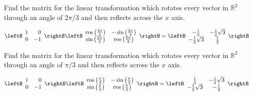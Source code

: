 \begin{enumialphparenastyle}
\begin{ex} Find the matrix for the linear transformation which rotates every
vector in $\mathbb{R}^{2}$ through an angle of $2\pi /3$ and then reflects
across the $x$ axis.
\begin{sol}
\[
\leftB
\begin{array}{rr}
1 & 0 \\
0 & -1
\end{array}
\rightB \leftB
\begin{array}{cc}
\cos \left( \frac{2\pi }{3}\right)  & -\sin \left( \frac{2\pi }{3}\right)
\\
\sin \left( \frac{2\pi }{3}\right)  & \cos \left( \frac{2\pi }{3}\right)
\end{array}
\rightB = \leftB
\begin{array}{cc}
-\frac{1}{2} & -\frac{1}{2}\sqrt{3} \\
-\frac{1}{2}\sqrt{3} & \frac{1}{2}
\end{array}
\rightB
\]
\end{sol}
\end{ex}

\begin{ex} Find the matrix for the linear transformation which rotates every
vector in $\mathbb{R}^{2}$ through an angle of $\pi /3$ and then reflects
across the $x$ axis.
\begin{sol}
\[
\leftB
\begin{array}{rr}
1 & 0 \\
0 & -1
\end{array}
\rightB \leftB
\begin{array}{cc}
\cos \left( \frac{\pi }{3}\right)  & -\sin \left( \frac{\pi }{3}\right)  \\
\sin \left( \frac{\pi }{3}\right)  & \cos \left( \frac{\pi }{3}\right)
\end{array}
\rightB = \leftB
\begin{array}{cc}
\frac{1}{2} & -\frac{1}{2}\sqrt{3} \\
-\frac{1}{2}\sqrt{3} & -\frac{1}{2}
\end{array}
\rightB
\]
\end{sol}
\end{ex}


\end{enumialphparenastyle}

